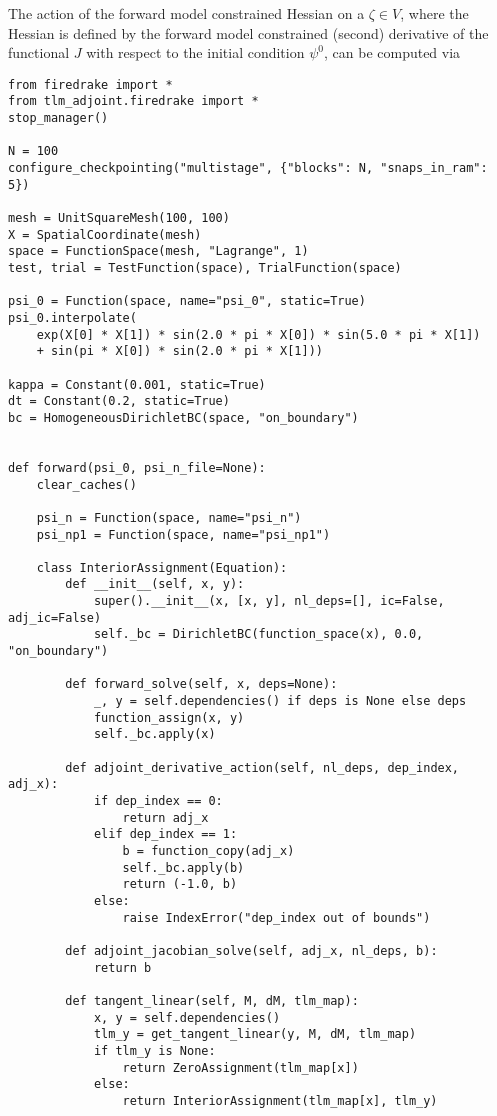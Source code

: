 \documentclass[11pt]{article}
\begin{document}
The action of the forward model constrained Hessian on a $\zeta \in V$, where
the Hessian is defined by the forward model constrained (second) derivative of
the functional $J$ with respect to the initial condition $\psi^0$, can be
computed via
\begin{lstlisting}
from firedrake import *
from tlm_adjoint.firedrake import *
stop_manager()

N = 100
configure_checkpointing("multistage", {"blocks": N, "snaps_in_ram": 5})

mesh = UnitSquareMesh(100, 100)
X = SpatialCoordinate(mesh)
space = FunctionSpace(mesh, "Lagrange", 1)
test, trial = TestFunction(space), TrialFunction(space)

psi_0 = Function(space, name="psi_0", static=True)
psi_0.interpolate(
    exp(X[0] * X[1]) * sin(2.0 * pi * X[0]) * sin(5.0 * pi * X[1])
    + sin(pi * X[0]) * sin(2.0 * pi * X[1]))

kappa = Constant(0.001, static=True)
dt = Constant(0.2, static=True)
bc = HomogeneousDirichletBC(space, "on_boundary")


def forward(psi_0, psi_n_file=None):
    clear_caches()

    psi_n = Function(space, name="psi_n")
    psi_np1 = Function(space, name="psi_np1")

    class InteriorAssignment(Equation):
        def __init__(self, x, y):
            super().__init__(x, [x, y], nl_deps=[], ic=False, adj_ic=False)
            self._bc = DirichletBC(function_space(x), 0.0, "on_boundary")

        def forward_solve(self, x, deps=None):
            _, y = self.dependencies() if deps is None else deps
            function_assign(x, y)
            self._bc.apply(x)

        def adjoint_derivative_action(self, nl_deps, dep_index, adj_x):
            if dep_index == 0:
                return adj_x
            elif dep_index == 1:
                b = function_copy(adj_x)
                self._bc.apply(b)
                return (-1.0, b)
            else:
                raise IndexError("dep_index out of bounds")

        def adjoint_jacobian_solve(self, adj_x, nl_deps, b):
            return b

        def tangent_linear(self, M, dM, tlm_map):
            x, y = self.dependencies()
            tlm_y = get_tangent_linear(y, M, dM, tlm_map)
            if tlm_y is None:
                return ZeroAssignment(tlm_map[x])
            else:
                return InteriorAssignment(tlm_map[x], tlm_y)


\end{lstlisting}
\end{document}
